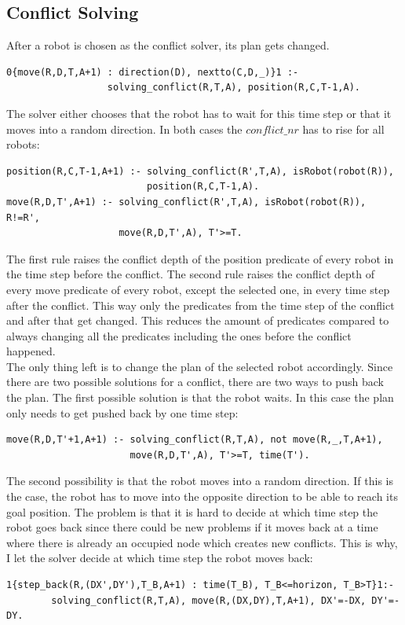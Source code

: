 \documentclass[runningheads]{llncs}
\begin{document}
\subsection{Conflict Solving}
After a robot is chosen as the conflict solver, its plan gets changed. 
\begin{verbatim}
0{move(R,D,T,A+1) : direction(D), nextto(C,D,_)}1 :- 
                  solving_conflict(R,T,A), position(R,C,T-1,A).
\end{verbatim}
The solver either chooses that the robot has to wait for this time step or that it moves into a random direction.
In both cases the $conflict\_nr$ has to rise for all robots:
\begin{verbatim}
position(R,C,T-1,A+1) :- solving_conflict(R',T,A), isRobot(robot(R)),
                         position(R,C,T-1,A).
move(R,D,T',A+1) :- solving_conflict(R',T,A), isRobot(robot(R)), R!=R', 
                    move(R,D,T',A), T'>=T.
\end{verbatim}
The first rule raises the conflict depth of the position predicate of every robot in the time step before the conflict. The second rule raises the conflict depth of every move predicate of every robot, except the selected one, in every time step after the conflict. This way only the predicates from the time step of the conflict and after that get changed. This reduces the amount of predicates compared to always changing all the predicates including the ones before the conflict happened. \\
The only thing left is to change the plan of the selected robot accordingly. Since there are two possible solutions for a conflict, there are two ways to push back the plan. The first possible solution is that the robot waits. In this case the plan only needs to get pushed back by one time step:
\begin{verbatim}
move(R,D,T'+1,A+1) :- solving_conflict(R,T,A), not move(R,_,T,A+1), 
                      move(R,D,T',A), T'>=T, time(T').
\end{verbatim}
The second possibility is that the robot moves into a random direction. If this is the case, the robot has to move into the opposite direction to be able to reach its goal position. The problem is that it is hard to decide at which time step the robot goes back since there could be new problems if it moves back at a time where there is already an occupied node which creates new conflicts. This is why, I let the solver decide at which time step the robot moves back:
\begin{verbatim}
1{step_back(R,(DX',DY'),T_B,A+1) : time(T_B), T_B<=horizon, T_B>T}1:- 
        solving_conflict(R,T,A), move(R,(DX,DY),T,A+1), DX'=-DX, DY'=-DY.
\end{verbatim}
\end{document}
